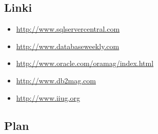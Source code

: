 \documentclass[12pt]{article}
\begin{document}
\subsection{Linki}
\begin{itemize}
\item \url{http://www.sqlservercentral.com}
\item \url{http://www.databaseweekly.com}
\item \url{http://www.oracle.com/oramag/index.html}
\item \url{http://www.db2mag.com}
\item \url{http://www.iiug.org}
\end{itemize}

\subsection{Plan}
\end{document}
